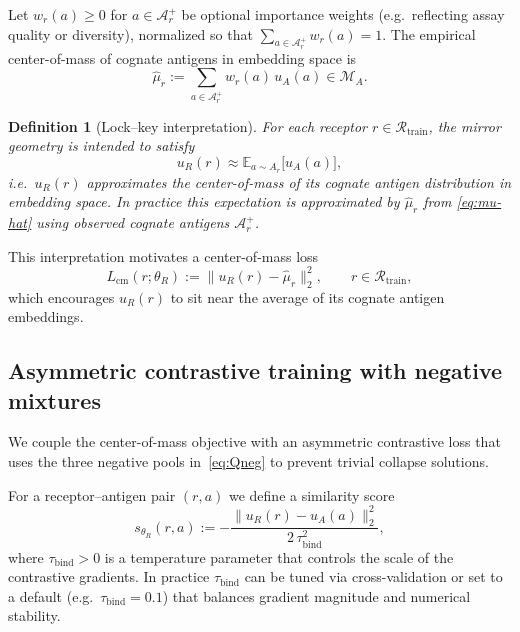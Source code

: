 \documentclass[11pt]{article}
\newcommand{\Rcal}{\mathcal{R}}
\newcommand{\M}{\mathcal{M}}
\newcommand{\Acal}{\mathcal{A}}
\newcommand{\E}{\mathbb{E}}
\newtheorem{definition}{Definition}
\begin{document}
Let $w_r(a) \ge 0$ for $a\in\Acal_r^+$ be optional importance weights
(e.g.\ reflecting assay quality or diversity), normalized so that
$\sum_{a\in\Acal_r^+} w_r(a)=1$. The empirical center-of-mass of cognate
antigens in embedding space is
\begin{equation}
  \hat{\mu}_r
    := \sum_{a\in\Acal_r^+} w_r(a)\, u_A(a)
    \in \M_A.
  \label{eq:mu-hat}
\end{equation}

\begin{definition}[Lock--key interpretation]
For each receptor $r\in\Rcal_{\mathrm{train}}$, the mirror geometry is intended
to satisfy
\[
  u_R(r) \approx \E_{a \sim A_r}\bigl[u_A(a)\bigr],
\]
i.e.\ $u_R(r)$ approximates the center-of-mass of its cognate antigen
distribution in embedding space. In practice this expectation is approximated
by $\hat{\mu}_r$ from \eqref{eq:mu-hat} using observed cognate antigens
$\Acal_r^+$.
\end{definition}

This interpretation motivates a center-of-mass loss
\begin{equation}
  L_{\mathrm{cm}}(r;\theta_R)
    := \bigl\| u_R(r) - \hat{\mu}_r \bigr\|_2^2,
  \qquad r \in \Rcal_{\mathrm{train}},
  \label{eq:Lcm}
\end{equation}
which encourages $u_R(r)$ to sit near the average of its cognate antigen
embeddings.

\subsection{Asymmetric contrastive training with negative mixtures}
\label{subsec:contrastive-R}

We couple the center-of-mass objective with an asymmetric contrastive loss that
uses the three negative pools in~\eqref{eq:Qneg} to prevent trivial collapse
solutions.

For a receptor--antigen pair $(r,a)$ we define a similarity score
\begin{equation}
  s_{\theta_R}(r,a)
    := -\frac{\bigl\|u_R(r) - u_A(a)\bigr\|_2^2}{2\,\tau_{\mathrm{bind}}^2},
  \label{eq:binding-score}
\end{equation}
where $\tau_{\mathrm{bind}}>0$ is a temperature parameter that controls the
scale of the contrastive gradients. In practice $\tau_{\mathrm{bind}}$ can be
tuned via cross-validation or set to a default (e.g.\ $\tau_{\mathrm{bind}}=0.1$)
that balances gradient magnitude and numerical stability.
\end{document}
